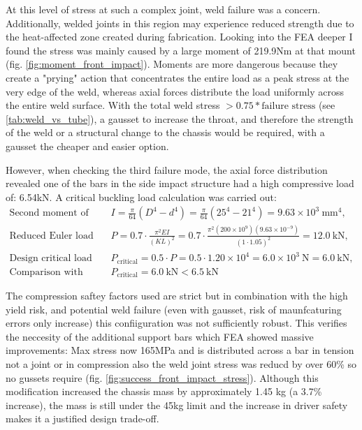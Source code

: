At this level of stress at such a complex joint, weld failure was a concern. Additionally, welded joints in this region may experience reduced strength due to the heat-affected zone created during fabrication. Looking into the FEA deeper I found the stress was mainly caused by a large moment of 219.9Nm at that mount (fig. \ref{fig:moment_front_impact}). Moments are more dangerous because they create a "prying" action that concentrates the entire load as a peak stress at the very edge of the weld, whereas axial forces distribute the load uniformly across the entire weld surface. With the total weld stress $>0.75* \text{failure stress}$ (see \ref{tab:weld_vs_tube}), a gausset to increase the throat, and therefore the strength of the weld or a structural change to the chassis would be required, with a gausset the cheaper and easier option.

However, when checking the third failure mode, the axial force distribution revealed one of the bars in the side impact structure had a high compressive load of: 6.54kN. A critical buckling load calculation was carried out:
\vspace{-5pt}
\begin{align*}
\text{Second moment of area: } & I = \frac{\pi}{64}(D^4-d^4) = \frac{\pi}{64}(25^4-21^4) = 9.63 \times 10^{3}~\text{mm}^4, \\
\text{Reduced Euler load (imperfection factor 0.7): } & P = 0.7 \cdot \frac{\pi^2 E I}{(K L)^2} = 0.7 \cdot \frac{\pi^2 (200 \times 10^9)(9.63\times10^{-9})}{(1 \cdot 1.05)^2} = 12.0~\text{kN}, \\
\text{Design critical load with safety factor 0.5: } & P_{\text{critical}} = 0.5 \cdot P = 0.5 \cdot 1.20 \times 10^{4} = 6.0 \times 10^{3}~\text{N} = 6.0~\text{kN}, \\
\text{Comparison with applied load: } & P_{\text{critical}} = 6.0~\text{kN} < 6.5~\text{kN}
\end{align*}

The compression saftey factors used are strict but in combination with the high yield risk, and potential weld failure (even with gausset, risk of maunfcaturing errors only increase) this confiiguration was not sufficiently robust. This verifies the neccesity of the additional support bars which FEA showed massive improvements: Max stress now 165MPa and is distributed across a bar in tension not a joint or in compression also the weld joint stress was reducd by over 60\% so no gussets require (fig. \ref{fig:success_front_impact_stress}). Although this modification increased the chassis mass by approximately 1.45 kg (a 3.7\% increase), the mass is still under the 45kg limit and the increase in driver safety makes it a justified design trade-off.

